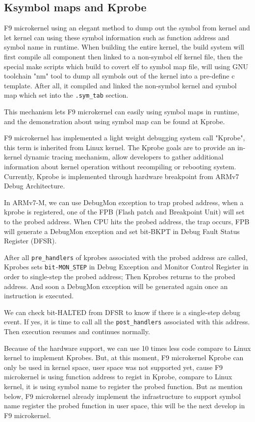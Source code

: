 \documentclass[10pt,preprint,nocopyrightspace]{sigplanconf}
\begin{document}
\subsection{Ksymbol maps and Kprobe}
F9 microkernel using an elegant method to dump out the symbol from kernel and let kernel can using these symbol information such as function address and symbol name in runtime. When building the entire kernel, the build system will first compile all component then linked to a non-symbol elf kernel file, then the special make scripts which build to covert elf to symbol map file, will using GNU toolchain "nm" tool to dump all symbols out of the kernel into a pre-define c template. After all, it compiled and linked the non-symbol kernel and symbol map which set into the \texttt{.sym\_tab} section.

This mechanism lets F9 microkernel can easily using symbol maps in runtime, and the demonstration about using symbol map can be found at Kprobe.

F9 microkernel has implemented a light weight debugging system call "Kprobe", this term is inherited from Linux kernel. The Kprobe goals are to provide an in-kernel dynamic tracing mechanism, allow developers to gather additional information about kernel operation without recompiling or rebooting system. Currently, Kprobe is implemented through hardware breakpoint from ARMv7 Debug Architecture. 

In ARMv7-M, we can use DebugMon exception to trap probed address\cite{yiu2013definitive}, when a kprobe is registered, one of the FPB (Flash patch and Breakpoint Unit) will set to the probed address. When CPU hits the probed address, the trap occurs, FPB will generate a DebugMon exception and set bit-BKPT in Debug Fault Status Register (DFSR).

After all \texttt{pre\_handlers} of kprobes associated with the probed address are called, Kprobes sets \texttt{bit-MON\_STEP} in Debug Exception and Monitor Control Register in order to single-step the probed address; Then Kprobes returns to
the probed address. And soon a DebugMon exception will be generated again once an instruction is executed.

We can check bit-HALTED from DFSR to know if there is a single-step debug event. If yes, it is time to call all the \texttt{post\_handlers} associated with this address. Then execution resumes and continues normally.

Because of the hardware support, we can use 10 times less code compare to Linux kernel to implement Kprobes. But, at this moment, F9 microkernel Kprobe can only be used in kernel space, user space was not supported yet, cause F9 microkernel is using function address to regist in Kprobe, compare to Linux kernel, it is using symbol name to register the probed function. But as mention below, F9 microkernel already implement the infrastructure to support symbol name register the probed function in user space, this will be the next develop in F9 microkernel.
\end{document}
